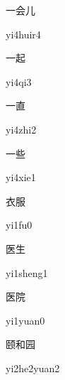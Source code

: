 \begin{verbete}[yi4huir4]{一会儿}
\begin{pronuncia}{yi4huir4}
\end{pronuncia}
\end{verbete}

\begin{verbete}[yi4qi3]{一起}
\begin{pronuncia}{yi4qi3}
\end{pronuncia}
\end{verbete}

\begin{verbete}[yi4zhi2]{一直}
\begin{pronuncia}{yi4zhi2}
\end{pronuncia}
\end{verbete}

\begin{verbete}[yi4xie1]{一些}
\begin{pronuncia}{yi4xie1}
\end{pronuncia}
\end{verbete}

\begin{verbete}[yi1fu0]{衣服}
\begin{pronuncia}{yi1fu0}
\end{pronuncia}
\end{verbete}

\begin{verbete}[yi1sheng1]{医生}
\begin{pronuncia}{yi1sheng1}
\end{pronuncia}
\end{verbete}

\begin{verbete}[yi1yuan0]{医院}
\begin{pronuncia}{yi1yuan0}
\end{pronuncia}
\end{verbete}

\begin{verbete}[yi2he2yuan2]{颐和园}
\begin{pronuncia}{yi2he2yuan2}
\end{pronuncia}
\end{verbete}

